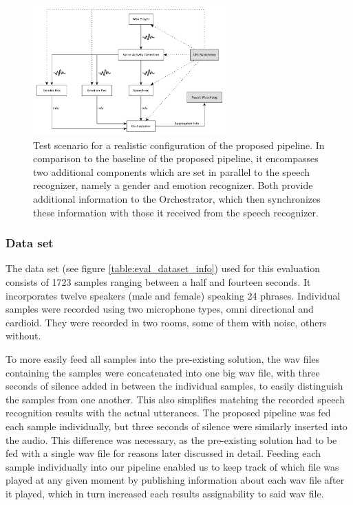 \begin{figure}[]
	\centering
	\includegraphics[width=0.66\textwidth]{diagrams/eval_pipeline_5.pdf}
	\caption{Test scenario for a realistic configuration of the proposed pipeline.
		In comparison to the baseline of the proposed pipeline, it encompasses two additional components which are set in parallel to the speech recognizer, namely a gender and emotion recognizer.
		Both provide additional information to the Orchestrator, which then synchronizes these information with those it received from the speech recognizer.}
	\label{pic:eval_p5_diag}
\end{figure}

\subsubsection{Data set}
\label{eval:dataset:dataset}

The data set (see figure \ref{table:eval_dataset_info}) used for this evaluation consists of 1723 samples ranging between a half and fourteen seconds.
It incorporates twelve speakers (male and female) speaking 24 phrases. 
Individual samples were recorded using two microphone types, omni directional and cardioid.
They were recorded in two rooms, some of them with noise, others without.

To more easily feed all samples into the pre-existing solution, the wav files containing the samples were concatenated into one big wav file, with three seconds of silence added in between the individual samples, to easily distinguish the samples from one another.
This also simplifies matching the recorded speech recognition results with the actual utterances.
The proposed pipeline was fed each sample individually, but three seconds of silence were similarly inserted into the audio.
This difference was necessary, as the pre-existing solution had to be fed with a single wav file for reasons later discussed in detail.
Feeding each sample individually into our pipeline enabled us to keep track of which file was played at any given moment by publishing information about each wav file after it played, which in turn increased each results assignability to said wav file.

